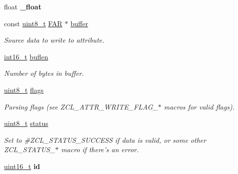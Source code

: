 \begin{DoxyCompactItemize}
\item 
\hypertarget{group__zcl_ga552109c4aeafc45875faff0313ae8202}{float {\bfseries \-\_\-float}}\label{group__zcl_ga552109c4aeafc45875faff0313ae8202}

\item 
\hypertarget{group__zcl_ga669940d05e1abc9807300f7d34169496}{const \hyperlink{group__hal_gae1affc9ca37cfb624959c866a73f83c2}{uint8\-\_\-t} \hyperlink{group__hal_gaef060b3456fdcc093a7210a762d5f2ed}{F\-A\-R} $\ast$ \hyperlink{group__zcl_ga669940d05e1abc9807300f7d34169496}{buffer}}\label{group__zcl_ga669940d05e1abc9807300f7d34169496}

\begin{DoxyCompactList}\small\item\em Source data to write to attribute. \end{DoxyCompactList}\item 
\hypertarget{group__zcl_ga0d88b9a4d20f93d09002c72ef71cf861}{\hyperlink{group__hal_ga2140805d08462d474b82ddc8d1c2f3e6}{int16\-\_\-t} \hyperlink{group__zcl_ga0d88b9a4d20f93d09002c72ef71cf861}{buflen}}\label{group__zcl_ga0d88b9a4d20f93d09002c72ef71cf861}

\begin{DoxyCompactList}\small\item\em Number of bytes in {\ttfamily buffer}. \end{DoxyCompactList}\item 
\hypertarget{group__zcl_gaa2585d779da0ab21273a8d92de9a0ebe}{\hyperlink{group__hal_gae1affc9ca37cfb624959c866a73f83c2}{uint8\-\_\-t} \hyperlink{group__zcl_gaa2585d779da0ab21273a8d92de9a0ebe}{flags}}\label{group__zcl_gaa2585d779da0ab21273a8d92de9a0ebe}

\begin{DoxyCompactList}\small\item\em Parsing flags (see Z\-C\-L\-\_\-\-A\-T\-T\-R\-\_\-\-W\-R\-I\-T\-E\-\_\-\-F\-L\-A\-G\-\_\-$\ast$ macros for valid flags). \end{DoxyCompactList}\item 
\hyperlink{group__hal_gae1affc9ca37cfb624959c866a73f83c2}{uint8\-\_\-t} \hyperlink{group__zcl_gade818037fd6c985038ff29656089758d}{status}
\begin{DoxyCompactList}\small\item\em Set to \#\-Z\-C\-L\-\_\-\-S\-T\-A\-T\-U\-S\-\_\-\-S\-U\-C\-C\-E\-S\-S if data is valid, or some other Z\-C\-L\-\_\-\-S\-T\-A\-T\-U\-S\-\_\-$\ast$ macro if there's an error. \end{DoxyCompactList}\item 
\hypertarget{group__zcl_ga4fc3a0c58dfbd1e68224521185cb9384}{\hyperlink{group__hal_ga5a8b2dc9e45a9ee81a94ef304fb62505}{uint16\-\_\-t} {\bfseries id}}\label{group__zcl_ga4fc3a0c58dfbd1e68224521185cb9384}


\end{DoxyCompactItemize}
